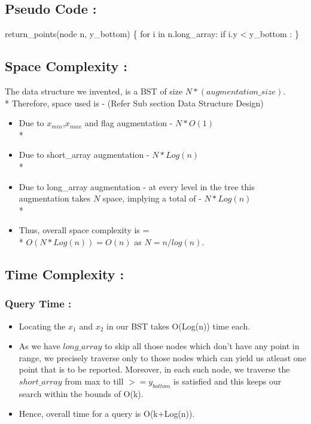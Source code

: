 \documentclass{article}
\begin{document}
\subsection{Pseudo Code : }

return\_points(node n, y\_bottom)
\{
    \hspace{1cm}
    for i in n.long\_array:
        if i.y < y\_bottom :
\}
\subsection{Space Complexity : }
The data structure we invented, is a BST of size $N*(augmentation\_size)$.\\*
Therefore, space used is - (Refer Sub section Data Structure Design)
\begin{itemize}
\item Due to $x_{min}$,$x_{max}$ and flag augmentation - $N * O(1)$ \\*
\item Due to short\_array augmentation - $N * Log(n)$ \\*
\item Due to long\_array augmentation - at every level in the tree this augmentation takes $N$ space, implying a total of - $N * Log(n)$ \\*  
\item Thus, overall space complexity is = \\*
$O(N*Log(n)) = O(n)$ as $N = n/log(n)$.
\end{itemize}
\subsection{Time Complexity : }
\subsubsection{Query Time : }
\begin{itemize}
\item Locating the $x_1$ and $x_2$ in our BST takes O(Log(n)) time each.
\item As we have $long\_{array}$ to skip all those nodes which don't have any point in range, we precisely traverse only to those nodes which can yield us atleast one point that is to be reported. Moreover, in each such node, we traverse the $short\_array$ from max to till $>=y_{bottom}$ is satisfied and this keeps our search within the bounds of O(k).
\item Hence, overall time for a query is O(k+Log(n)). 
\end{itemize}
\end{document}
